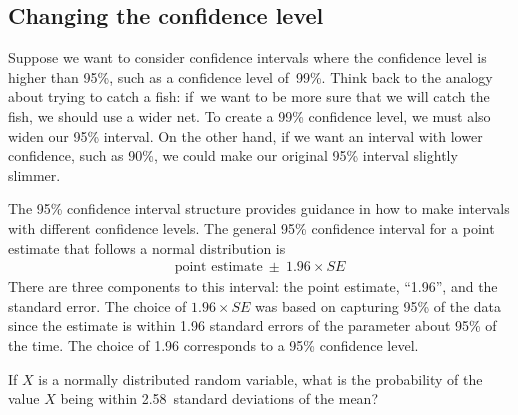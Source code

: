 \subsection{Changing the confidence level}
\label{changingTheConfidenceLevelSection}


Suppose we want to consider confidence intervals where the confidence
level is higher than 95\%, such as a confidence
level of~99\%. Think back to the analogy about trying to catch a fish:
if~we want to be more sure that we will catch the fish, we should use
a wider net. To create a 99\% confidence level, we must also widen our
95\% interval. On the other hand, if we want an interval with lower
confidence, such as 90\%, we could make our original 95\% interval
slightly slimmer.

The 95\% confidence interval structure provides guidance in
how to make intervals with different confidence levels.
The general 95\% confidence interval for a point estimate
that follows a normal distribution is
\begin{eqnarray*}
\text{point estimate}\ \pm\ 1.96 \times SE
\end{eqnarray*}
There are three components to this interval: the point estimate,
``1.96'', and the standard error. The choice of $1.96\times SE$ was
based on capturing 95\% of the data since the estimate is within
1.96 standard errors of the parameter about 95\% of the time.
The choice of 1.96 corresponds to a 95\% confidence level. 

\begin{exercisewrap}
\begin{nexercise} \label{leadInForMakingA99PercentCIExercise}
If $X$ is a normally distributed random variable, what is the
probability of the value $X$ being
within 2.58~standard deviations of the mean?\footnotemark
\end{nexercise}
\end{exercisewrap}

